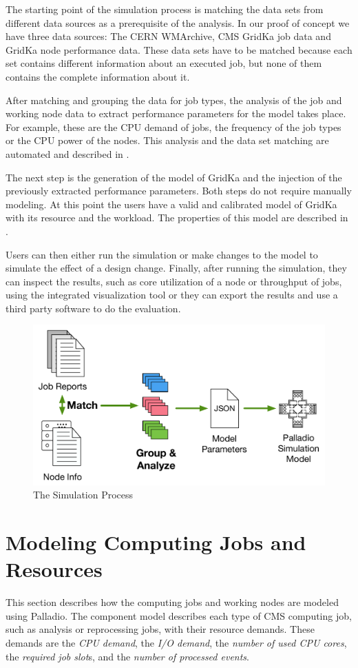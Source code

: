 \documentclass[a4paper]{jpconf}
\begin{document}
The starting point of the simulation process is matching the data sets from different data sources as a prerequisite  of the analysis. In our proof of concept we have three data sources: The CERN WMArchive, CMS GridKa job data and GridKa node performance data. These data sets have to be matched because each set contains different information about an executed job, but none of them contains the complete information about it.

After matching and grouping the data for job types, the analysis of the job and working node data to extract performance parameters for the model takes place. For example, these are the CPU demand of jobs, the frequency of the job types or the CPU power of the nodes. This analysis and the data set matching are automated and described in .

The next step is the generation of the model of GridKa and the injection of the previously extracted performance parameters. Both steps do not require manually modeling. At this point the users have a valid and calibrated model of GridKa with its resource and the workload. The properties of this model are described in .

Users can then either run the simulation or make changes to the model to simulate the effect of a design change. 
Finally, after running the simulation, they can inspect the results, such as core utilization of a node or throughput of jobs, using the integrated visualization tool or they can export the results and use a third party software to do the evaluation.

\begin{figure}
	\centering
	\includegraphics[width=0.55\linewidth]{images/process}
	\caption[]{The Simulation Process}
	\label{process}
\end{figure}


\section{Modeling Computing Jobs and Resources}
\label{sec:model}
This section describes how the computing jobs and working nodes are modeled using Palladio.
The component model describes each type of CMS computing job, such as analysis or reprocessing jobs, with their resource demands. These demands are the \textit{CPU demand}, the\textit{ I/O demand}, the \textit{number of used CPU cores}, the \textit{required job slot}s, and the \textit{number of processed events}.
\end{document}
